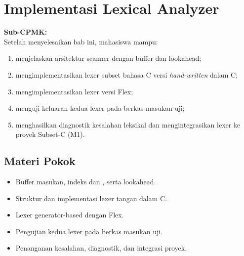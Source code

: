 \documentclass[../../main.tex]{subfiles}
\begin{document}
\chapter[Implementasi Lexical Analyzer]{Implementasi Lexical Analyzer}
\label{chap:implementasi-lexer}

\begin{outcomebox}
\textbf{Sub-CPMK:} \\[3pt]
Setelah menyelesaikan bab ini, mahasiswa mampu:
\begin{enumerate}[label=\arabic*.,leftmargin=*]
  \item menjelaskan arsitektur scanner dengan buffer dan lookahead;
  \item mengimplementasikan lexer subset bahasa C versi
        \textit{hand-written} dalam C;
  \item mengimplementasikan lexer versi Flex;
  \item menguji keluaran kedua lexer pada berkas masukan uji;
  \item menghasilkan diagnostik kesalahan leksikal dan
        mengintegrasikan lexer ke proyek Subset-C (M1).
\end{enumerate}
\end{outcomebox}

\section*{Materi Pokok}
\begin{itemize}[leftmargin=*]
  \item Buffer masukan, indeks  dan , serta
        lookahead.
  \item Struktur dan implementasi lexer tangan dalam C.
  \item Lexer generator-based dengan Flex.
  \item Pengujian kedua lexer pada berkas masukan uji.
  \item Penanganan kesalahan, diagnostik, dan integrasi proyek.
\end{itemize}















\ifSubfilesClassLoaded{%
}{}
\end{document}
